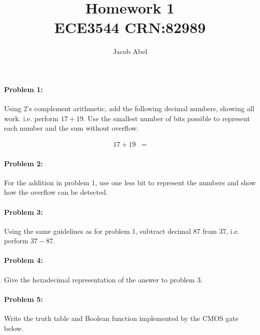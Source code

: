 \documentclass[12pt,letterpaper,titlepage]{article}
\author{Jacob Abel}
\title{	Homework 1
	\\\large ECE3544 CRN:82989
}
\begin{document}
\maketitle
\begin{raggedright}

\paragraph{Problem 1: }
Using 2's complement arithmetic, add the following decimal numbers, showing all work. i.e. perform $17+19$. Use the smallest number of bits possible to represent each number and the sum without overflow. 

\begin{align*}
17+19 &=
\end{align*}

\paragraph{Problem 2: }
For the addition in problem 1, use one less bit to represent the numbers and show how the overflow can be detected.

\paragraph{Problem 3: }
Using the same guidelines as for problem 1, subtract decimal $87$ from $37$, i.e. perform $37-87$.

\paragraph{Problem 4: }
Give the hexadecimal representation of the answer to problem 3.

\paragraph{Problem 5: }
Write the truth table and Boolean function implemented by the CMOS gate below.


\end{raggedright}
\end{document}
